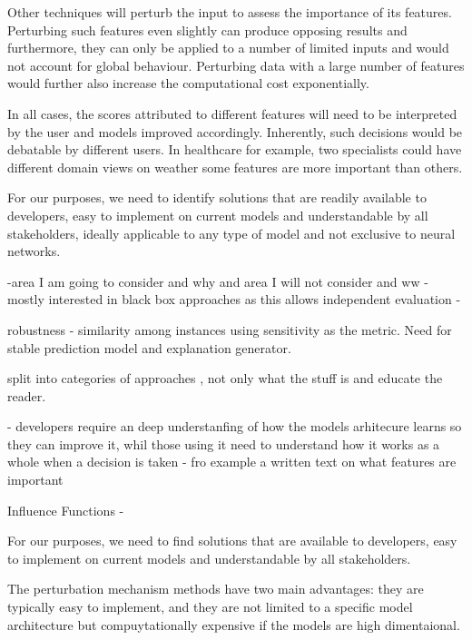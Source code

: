 \documentclass[proposal]{softeng}
\begin{document}
Other techniques will perturb the input to assess the importance of its features. Perturbing such features even slightly can produce opposing results and furthermore, they can only be applied to a number of limited inputs and would not account for global behaviour. Perturbing data with a large number of features would further also increase the computational cost exponentially.

In all cases, the scores attributed to different features will need to be interpreted by the user and models improved accordingly. Inherently, such decisions would be debatable by different users. In healthcare for example, two specialists could have different domain views on weather some features are more important than others.


For our purposes, we need to identify solutions that are readily available to developers, easy to implement on current models and understandable by all stakeholders, ideally applicable to any type of model and not exclusive to neural networks.




-area I am going to consider and why and area I will not consider and ww
- mostly interested in black box approaches as this allows independent evaluation
-


robustness - similarity among instances using sensitivity as the metric. Need for stable prediction model and explanation generator.


split into categories of approaches , not only what the stuff is and educate the reader.

- developers require an deep understanfing of how the models arhitecure learns so they can improve it, whil those using it need to understand how it works as a whole when a decision is taken - fro example a written text on what features are important 

Influence Functions -




For our purposes, we need to find solutions that are available to developers, easy to implement on current models and understandable by all stakeholders.

The perturbation mechanism methods have two main advantages: they are typically easy to implement, and they are not limited to a specific model architecture but compuytationally expensive if the models are high dimentaional.
\end{document}
